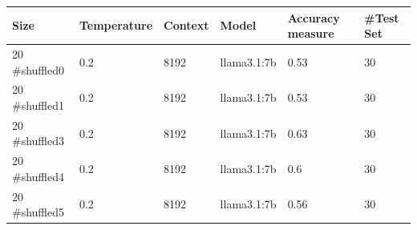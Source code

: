 \begin{table}[!ht]
    \centering
    \small
    \label{tab:result_shuffled}
    \begin{tabular}{|l|l|l|l|l|l|}
        \hline
        \textbf{Size} & \textbf{Temperature} & \textbf{Context} & \textbf{Model} & \textbf{Accuracy measure} & \textbf{\#Test Set} \\ \hline
        20 \#shuffled0 & 0.2 & 8192 & llama3.1:7b & 0.53 & 30 \\ \hline
        20 \#shuffled1 & 0.2 & 8192 & llama3.1:7b & 0.53 & 30 \\ \hline
        20 \#shuffled3 & 0.2 & 8192 & llama3.1:7b & 0.63 & 30 \\ \hline
        20 \#shuffled4 & 0.2 & 8192 & llama3.1:7b & 0.6 & 30 \\ \hline
        20 \#shuffled5 & 0.2 & 8192 & llama3.1:7b & 0.56 & 30 \\ \hline
    \end{tabular}
\end{table}
